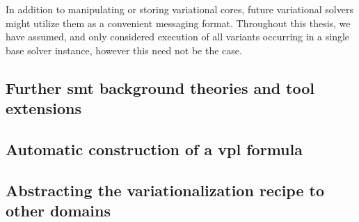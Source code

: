 In addition to manipulating or storing variational cores, future variational
solvers might utilize them as a convenient messaging format. Throughout this
thesis, we have assumed, and only considered execution of all variants occurring
in a single base solver instance, however this need not be the case.

\subsection{Further \ac{smt} background theories and tool extensions}

\subsection{Automatic construction of a \ac{vpl} formula}

\subsection{Abstracting the variationalization recipe to other domains}


